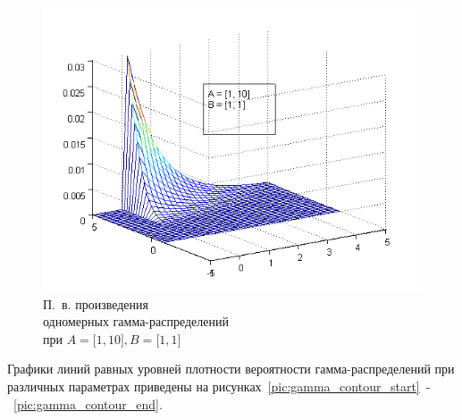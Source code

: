 \begin{figure}[h!]
  \centering
  \includegraphics[width=0.5\linewidth]{pic/new/gamma_mesh_7}
  \caption{П.~в. произведения \\ одномерных гамма-распределений \\
    при $ A = \big[1, 10\big], B = \big[ 1, 1 \big] $}\label{pic:gamma_mesh_end}
\end{figure}

\newpage

Графики линий равных уровней плотности вероятности гамма-распределений при различных
параметрах приведены на рисунках~\ref{pic:gamma_contour_start}~-~\ref{pic:gamma_contour_end}.

